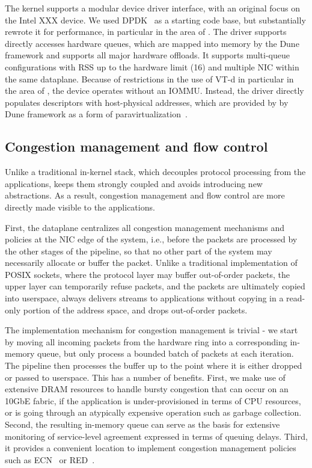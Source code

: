 The \ix kernel supports a modular device driver interface, with an
original focus on the Intel XXX device.  We used
DPDK~\cite{missing-dpdk} as a starting code base, but substantially
rewrote it for performance, in particular in the area of
.  The driver supports directly accesses hardware
queues, which are mapped into memory by the Dune framework and
supports all major hardware offloads.  It supports multi-queue
configurations with RSS up to the hardware limit (16) and multiple NIC
within the same dataplane.  Because of restrictions in the use of VT-d
in particular in the area of , the device operates without
an IOMMU.  Instead, the driver directly populates descriptors with
host-physical addresses, which are provided by by Dune framework as a
form of paravirtualization~\cite{DBLP:conf/sosp/BarhamDFHHHN03}.



\subsection{Congestion management and flow control}
\label{sec:impl:net}

Unlike a traditional in-kernel stack, which decouples protocol
processing from the applications, \ix keeps them strongly coupled and
avoids introducing new abstractions.  As a result, congestion
management and flow control are more directly made visible to the
applications.

First, the \ix dataplane centralizes all congestion management
mechanisms and policies at the NIC edge of the system, i.e., before
the packets are processed by the other stages of the pipeline, so that
no other part of the system may necessarily allocate or buffer the
packet.  Unlike a traditional implementation of POSIX sockets, where
the protocol layer may buffer out-of-order packets, the upper layer
can temporarily refuse packets, and the packets are ultimately copied
into userspace, \ix always delivers streams to applications without
copying in a read-only portion of the address space, and drops
out-of-order packets.

The implementation mechanism for congestion management is trivial - we
start by moving all incoming packets from the hardware ring into a
corresponding in-memory queue, but only process a bounded batch of
packets at each iteration.  The pipeline then processes the buffer up
to the point where it is either dropped or passed to userspace.  This
has a number of benefits.  First, we make use of extensive DRAM
resources to handle bursty congestion that can occur on an 10GbE
fabric, if the application is under-provisioned in terms of CPU
resources, or is going through an atypically expensive operation such
as garbage collection.  Second, the resulting in-memory queue can
serve as the basis for extensive monitoring of service-level agreement
expressed in terms of queuing delays.  Third, it provides a convenient
location to implement congestion management policies such as
ECN~\cite{ramakrishnan2001addition} or
RED~\cite{DBLP:journals/ton/FloydJ93}.


